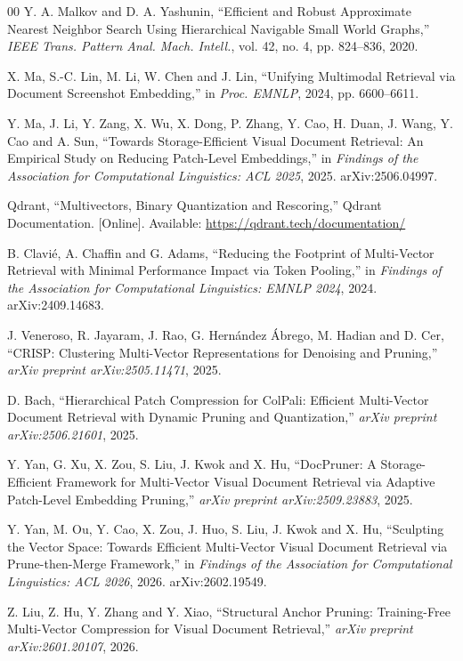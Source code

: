 \documentclass[conference]{IEEEtran}
\begin{document}
\begin{thebibliography}{00}
Y. A. Malkov and D. A. Yashunin, ``Efficient and Robust Approximate Nearest
Neighbor Search Using Hierarchical Navigable Small World Graphs,'' \emph{IEEE
Trans. Pattern Anal. Mach. Intell.}, vol. 42, no. 4, pp. 824--836, 2020.

X. Ma, S.-C. Lin, M. Li, W. Chen and J. Lin, ``Unifying Multimodal Retrieval via
Document Screenshot Embedding,'' in \emph{Proc. EMNLP}, 2024, pp. 6600--6611.

Y. Ma, J. Li, Y. Zang, X. Wu, X. Dong, P. Zhang, Y. Cao, H. Duan, J. Wang,
Y. Cao and A. Sun, ``Towards Storage-Efficient Visual Document Retrieval: An
Empirical Study on Reducing Patch-Level Embeddings,'' in \emph{Findings of the
Association for Computational Linguistics: ACL 2025}, 2025. arXiv:2506.04997.

Qdrant, ``Multivectors, Binary Quantization and Rescoring,'' Qdrant
Documentation. [Online]. Available: \url{https://qdrant.tech/documentation/}

B. Clavi\'e, A. Chaffin and G. Adams, ``Reducing the Footprint of Multi-Vector
Retrieval with Minimal Performance Impact via Token Pooling,'' in \emph{Findings
of the Association for Computational Linguistics: EMNLP 2024}, 2024.
arXiv:2409.14683.

J. Veneroso, R. Jayaram, J. Rao, G. Hern\'andez \'Abrego, M. Hadian and D. Cer,
``CRISP: Clustering Multi-Vector Representations for Denoising and Pruning,''
\emph{arXiv preprint arXiv:2505.11471}, 2025.

D. Bach, ``Hierarchical Patch Compression for ColPali: Efficient Multi-Vector
Document Retrieval with Dynamic Pruning and Quantization,'' \emph{arXiv
preprint arXiv:2506.21601}, 2025.

Y. Yan, G. Xu, X. Zou, S. Liu, J. Kwok and X. Hu, ``DocPruner: A
Storage-Efficient Framework for Multi-Vector Visual Document Retrieval via
Adaptive Patch-Level Embedding Pruning,'' \emph{arXiv preprint
arXiv:2509.23883}, 2025.

Y. Yan, M. Ou, Y. Cao, X. Zou, J. Huo, S. Liu, J. Kwok and X. Hu, ``Sculpting
the Vector Space: Towards Efficient Multi-Vector Visual Document Retrieval via
Prune-then-Merge Framework,'' in \emph{Findings of the Association for
Computational Linguistics: ACL 2026}, 2026. arXiv:2602.19549.

Z. Liu, Z. Hu, Y. Zhang and Y. Xiao, ``Structural Anchor Pruning:
Training-Free Multi-Vector Compression for Visual Document Retrieval,''
\emph{arXiv preprint arXiv:2601.20107}, 2026.


\end{thebibliography}
\end{document}

